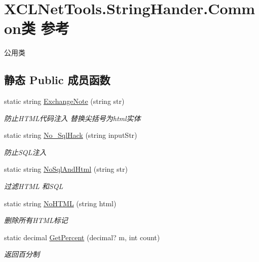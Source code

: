 \hypertarget{class_x_c_l_net_tools_1_1_string_hander_1_1_common}{}\section{X\+C\+L\+Net\+Tools.\+String\+Hander.\+Common类 参考}
\label{class_x_c_l_net_tools_1_1_string_hander_1_1_common}


公用类  


\subsection*{静态 Public 成员函数}
\begin{DoxyCompactItemize}
\item 
static string \hyperlink{class_x_c_l_net_tools_1_1_string_hander_1_1_common_af6ad14eae24704cda11cc498849d9737}{Exchange\+Note} (string str)
\begin{DoxyCompactList}\small\item\em 防止\+H\+T\+M\+L代码注入 替换尖括号为html实体 \end{DoxyCompactList}\item 
static string \hyperlink{class_x_c_l_net_tools_1_1_string_hander_1_1_common_accef3263e7a42ba85bc76477e95f42f9}{No\+\_\+\+Sql\+Hack} (string input\+Str)
\begin{DoxyCompactList}\small\item\em 防止\+S\+Q\+L注入 \end{DoxyCompactList}\item 
static string \hyperlink{class_x_c_l_net_tools_1_1_string_hander_1_1_common_a67d87071f6b40c184fd81a6f2e5e923e}{No\+Sql\+And\+Html} (string str)
\begin{DoxyCompactList}\small\item\em 过滤\+H\+T\+ML 和\+S\+QL \end{DoxyCompactList}\item 
static string \hyperlink{class_x_c_l_net_tools_1_1_string_hander_1_1_common_a7879e3cc9494f80e00f989cec68122e7}{No\+H\+T\+ML} (string html)
\begin{DoxyCompactList}\small\item\em 删除所有\+H\+T\+M\+L标记 \end{DoxyCompactList}\item 
static decimal \hyperlink{class_x_c_l_net_tools_1_1_string_hander_1_1_common_af224708ab1da72fa31450558049720c2}{Get\+Percent} (decimal? m, int count)
\begin{DoxyCompactList}\small\item\em 返回百分制 \end{DoxyCompactList}\item 

\end{DoxyCompactItemize}
